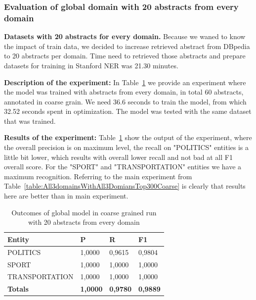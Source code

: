 \documentclass[thesis=M,english]{FITthesis}[2018/05/30]
\begin{document}
\subsubsection{Evaluation of global domain with 20 abstracts from every domain }
\textbf{Datasets with 20 abstracts for every domain.} Because we waned to know the impact of train data, we decided to increase retrieved abstract from DBpedia to 20 abstracts per domain. Time need to retrieved those abstracts and prepare datasets for training in Stanford NER was 21.30 minutes.

\textbf{Description of the experiment:} In Table~\ref{table:GlobalDomainWithAllAbstractsTop20Coarse} we provide an experiment where the model was trained with abstracts from every domain, in total 60 abstracts, annotated in coarse grain. We need 36.6 seconds to train the model, from which 32.52 seconds spent in optimization. The model was tested with the same dataset that was trained.    

\textbf{Results of the experiment:} Table~\ref{table:GlobalDomainWithAllAbstractsTop20Coarse} show the output of the experiment, where the overall precision is on maximum level, the recall on "POLITICS" entities is a little bit lower, which results with overall lower recall and not bad at all F1 overall score. For the "SPORT" and "TRANSPORTATION" entities we have a maximum recognition. Referring to the main experiment from Table~\ref{table:All3domainsWithAll3DomiansTop300Coarse} is clearly that results here are better than in main experiment.

	\begin{table}[H]\centering
		\begin{tabular}{|l|l|l|l|}
			\hline {\textbf{Entity}} & {\textbf{P}} & {\textbf{R}} & {\textbf{F1}}\\\hline
				POLITICS & 1,0000 & 0,9615 & 0,9804\\
				SPORT & 1,0000 & 1,0000 & 1,0000\\
				TRANSPORTATION & 1,0000 & 1,0000 & 1,0000\\\hline
				\textbf{Totals} & \textbf{1,0000} & \textbf{0,9780} & \textbf{0,9889}\\\hline
		\end{tabular}
		\caption{Outcomes of global model in coarse grained run with 20 abstracts from every domain \label{table:GlobalDomainWithAllAbstractsTop20Coarse}}
	\end{table}
\end{document}
